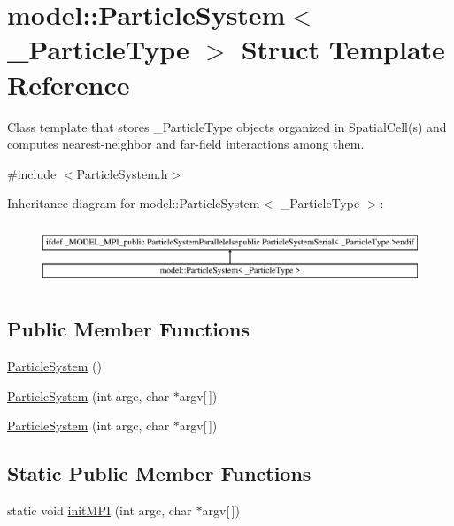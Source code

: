 \hypertarget{structmodel_1_1_particle_system}{}\section{model\+:\+:Particle\+System$<$ \+\_\+\+Particle\+Type $>$ Struct Template Reference}
\label{structmodel_1_1_particle_system}


Class template that stores \+\_\+\+Particle\+Type objects organized in Spatial\+Cell(s) and computes nearest-\/neighbor and far-\/field interactions among them.  




{\ttfamily \#include $<$Particle\+System.\+h$>$}

Inheritance diagram for model\+:\+:Particle\+System$<$ \+\_\+\+Particle\+Type $>$\+:\begin{figure}[H]
\begin{center}
\leavevmode
\includegraphics[height=1.833061cm]{structmodel_1_1_particle_system}
\end{center}
\end{figure}
\subsection*{Public Member Functions}
\begin{DoxyCompactItemize}
\item 
\hyperlink{structmodel_1_1_particle_system_a48b660c03bbce663d4c84e064c121fb3}{Particle\+System} ()
\item 
\hyperlink{structmodel_1_1_particle_system_a0fe37f84d729151d6d8a088aa2cd7e08}{Particle\+System} (int argc, char $\ast$argv\mbox{[}$\,$\mbox{]})
\item 
\hyperlink{structmodel_1_1_particle_system_a0fe37f84d729151d6d8a088aa2cd7e08}{Particle\+System} (int argc, char $\ast$argv\mbox{[}$\,$\mbox{]})
\end{DoxyCompactItemize}
\subsection*{Static Public Member Functions}
\begin{DoxyCompactItemize}
\item 
static void \hyperlink{structmodel_1_1_particle_system_a4e0f42f05f7a3755040ff1cb366e88c2}{init\+M\+P\+I} (int argc, char $\ast$argv\mbox{[}$\,$\mbox{]})
\end{DoxyCompactItemize}


